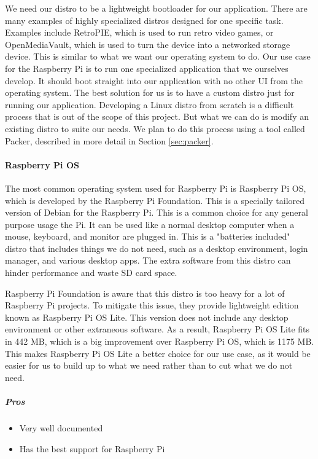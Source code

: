 We need our distro to be a lightweight bootloader for our application. There are many
examples of highly specialized distros designed for one specific task. Examples
include RetroPIE, which is used to run retro video games, or OpenMediaVault, which is used
to turn the device into a networked storage device. This is similar to what we want our
operating system to do. Our use case for the Raspberry Pi is to run one specialized
application that we ourselves develop. It should boot straight into our application with
no other UI from the operating system. The best solution for us is to have a custom distro
just for running our application. Developing a Linux distro from scratch is a difficult
process that is out of the scope of this project. But what we can do is modify an existing
distro to suite our needs. We plan to do this process using a tool called Packer,
described in more detail in Section \ref{sec:packer}.

\paragraph{Raspberry Pi OS}

The most common operating system used for Raspberry Pi is Raspberry Pi OS, which is
developed by the Raspberry Pi Foundation. This is a specially tailored version of Debian
for the Raspberry Pi. This is a common choice for any general purpose usage the Pi. It can
be used like a normal desktop computer when a mouse, keyboard, and monitor are plugged in.
This is a "batteries included" distro that includes things we do not need, such as a
desktop environment, login manager, and various desktop apps. The extra software from this
distro can hinder performance and waste SD card space.

Raspberry Pi Foundation is aware that this distro is too heavy for a lot of Raspberry Pi
projects. To mitigate this issue, they provide lightweight edition known as Raspberry Pi
OS Lite. This version does not include any desktop environment or other extraneous
software. As a result, Raspberry Pi OS Lite fits in 442 MB, which is a big improvement
over Raspberry Pi OS, which is 1175 MB. This makes Raspberry Pi OS Lite a better choice
for our use case, as it would be easier for us to build up to what we need rather than to
cut what we do not need.

\subparagraph{Pros}
\begin{itemize}
  \item Very well documented
  \item Has the best support for Raspberry Pi
\end{itemize}

